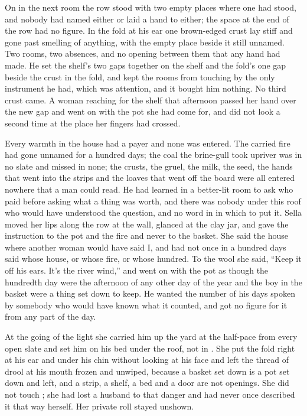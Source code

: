 On  in the next room the row stood with two empty places where one had stood, and nobody had named either or laid a hand to either; the space at the end of the row had no figure. In the fold at his ear one brown-edged crust lay stiff and gone past smelling of anything, with the empty place beside it still unnamed. Two rooms, two absences, and no opening between them that any hand had made. He set the shelf's two gaps together on the shelf and the fold's one gap beside the crust in the fold, and kept the rooms from touching by the only instrument he had, which was attention, and it bought him nothing. No third crust came. A woman reaching for the shelf that afternoon passed her hand over the new gap and went on with the pot she had come for, and did not look a second time at the place her fingers had crossed.

Every warmth in the house had a payer and none was entered. The carried fire had gone unnamed for a hundred days; the coal the brine-gull took upriver was in no slate and missed in none; the crusts, the gruel, the milk, the seed, the hands that went into the strips and the loaves that went off the board were all entered nowhere that a man could read. He had learned in a better-lit room to ask who paid before asking what a thing was worth, and there was nobody under this roof who would have understood the question, and no word in  in which to put it. Sella moved her lips along the row at the wall, glanced at the clay jar, and gave the instruction to the pot and the fire and never to the basket. She said the house where another woman would have said I, and had not once in a hundred days said whose house, or whose fire, or whose hundred. To the wool she said, “Keep it off his ears. It's the river wind,” and went on with the pot as though the hundredth day were the afternoon of any other day of the year and the boy in the basket were a thing set down to keep. He wanted the number of his days spoken by somebody who would have known what it counted, and got no figure for it from any part of the day.

\scenebreak

At the going of the light she carried him up the yard at the half-pace from every open slate and set him on his bed under the roof, not in . She put the fold right at his ear and under his chin without looking at his face and left the thread of drool at his mouth frozen and unwiped, because a basket set down is a pot set down and left, and a strip, a shelf, a bed and a door are not openings. She did not touch ; she had lost a husband to that danger and had never once described it that way herself. Her private roll stayed unshown.

